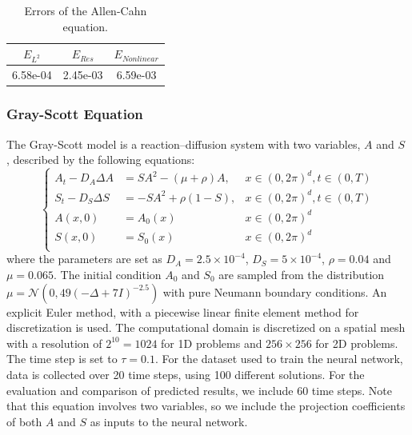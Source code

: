 \documentclass[preprint,12pt]{elsarticle}
\theoremstyle{plain}
\numberwithin{figure}{section}
\numberwithin{table}{section}
\begin{document}
\begin{table}[!htbp]
	\centering
	\caption{Errors of the Allen-Cahn equation.}
	\begin{tabular}{ccc}
		\hline
		$E_{L^2}$ &  $E_{Res}$  &$E_{Nonlinear}$\\
		\hline
		6.58e-04&2.45e-03&6.59e-03\\
		\hline
	\end{tabular}
	\label{tab:ac}
\end{table}

\subsubsection{Gray-Scott Equation}
The Gray-Scott model is a reaction--diffusion system with two variables,  $A$  and  $S$ , described by the following equations:
\begin{equation}
	\left\{	\begin{aligned}
		A_t-D_A\Delta A &= SA^2-(\mu+\rho)A, &x \in (0,2\pi)^d,t\in(0,T)\\
		S_t-D_S\Delta S &= -SA^2+\rho(1-S), &x\in (0,2\pi)^d,t\in(0,T)\\
		A(x,0) &= A_0(x)  &x \in (0,2\pi)^d\\
		S(x,0) &= S_0(x)  &x \in (0,2\pi)^d\\
	\end{aligned}\right.
\end{equation}
where  the parameters are set as $D_A=2.5\times 10^{-4}$, $D_S=5\times10^{-4}$, $\rho=0.04$ and $\mu=0.065$. The initial condition  $A_0 $ and $S_0$ are sampled from the distribution $\mu=\mathcal{N}(0,49(-\Delta+7I)^{-2.5})$ with pure Neumann boundary conditions. An explicit Euler method, with a piecewise linear finite element method for discretization is used. The computational domain is discretized on a spatial mesh with a resolution of $2^{10}=1024$ for 1D problems and $256\times 256$ for 2D problems. The time step is set to $\tau=0.1$. For the dataset used to train the neural network, data is collected over 20 time steps, using 100 different solutions. For the evaluation and comparison of predicted results, we include 60 time steps. Note that this equation involves two variables, so we include the projection coefficients of both $A$ and $S$ as inputs to the neural network.
\end{document}
